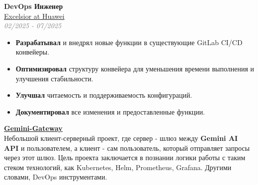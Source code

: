 \documentclass[10pt, a4paper]{article}
\begin{document}

\begin{minipage}[t]{0.55\textwidth}

\raggedright

\hspace{0.5cm}
\begin{minipage}[t]{0.9\textwidth}
    \raggedright
    \textbf{\Large DevOps Инженер} \\[2pt]
    \textcolor{graytext}{\href{https://rnew.tilda.ws/excelsiorathuawei}{Excelsior at Huawei}}\extlink \\
    \textcolor{graytext}{\textit{02/2025 - 07/2025}}
    \begin{itemize}
        \item \textbf{Разрабатывал} и внедрял новые функции в существующие GitLab CI/CD конвейеры.
        \item \textbf{Оптимизировал} структуру конвейера для уменьшения времени выполнения и улучшения стабильности.
        \item \textbf{Улучшал} читаемость и поддерживаемость конфигураций.
        \item \textbf{Документировал} все изменения и предоставленные функции.
    \end{itemize}
\end{minipage}

\vspace{1cm}

\hspace{0.5cm}
\begin{minipage}[t]{0.9\textwidth}
    \raggedright
    \textbf{\Large \href{https://github.com/Isn0v/gemini-gateway}{Gemini-Gateway}\extlink } \\[2pt]
    Небольшой клиент-серверный проект, где сервер - шлюз между \textbf{Gemini AI API} и пользователем, а клиент - сам пользователь, который отправляет запросы через этот шлюз. Цель проекта заключается в познании логики работы с таким стеком технологий, как Kubernetes, Helm, Prometheus, Grafana. Другими словами, DevOps инструментами.\\
\end{minipage}


\end{minipage}
\end{document}
